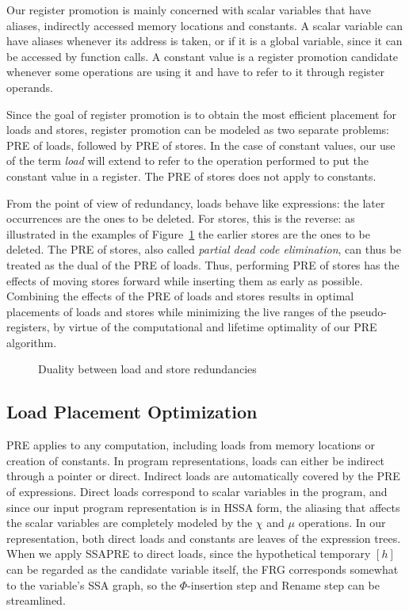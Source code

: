 Our register promotion is mainly concerned with scalar variables that have aliases, indirectly accessed memory locations and constants. 
A scalar variable can have aliases whenever its address is taken, or if it is a global variable, since it can be accessed by function calls. 
A constant value is a register promotion candidate whenever some operations are using it and have to refer to it through register operands. 

Since the goal of register promotion is to obtain the most efficient placement for loads and stores, register promotion can be modeled as two separate problems: 
PRE of loads, followed by PRE of stores. 
In the case of constant values, our use of the term \emph{load} will extend to refer to the operation performed to put the constant value in a register. 
The PRE of stores does not apply to constants.

From the point of view of redundancy, loads behave like expressions: 
the later occurrences are the ones to be deleted. 
For stores, this is the reverse: 
as illustrated in the examples of Figure~\ref{fig:load-store-dual} the earlier stores are the ones to be deleted. 
The PRE of stores, also called \emph{partial dead code elimination}, can thus be treated as the dual of the PRE of loads. 
Thus, performing PRE of stores has the effects of moving stores forward while inserting them as early as possible. 
Combining the effects of the PRE of loads and stores results in optimal placements of loads and stores while minimizing the live ranges of the pseudo-registers, by virtue of the computational and lifetime optimality of our PRE algorithm.

\begin{figure}
\centering
\caption{Duality between load and store redundancies}
\label{fig:load-store-dual}
\end{figure}

\subsection{Load Placement Optimization}
PRE applies to any computation, including loads from memory locations or creation of constants. 
In program representations, loads can either be indirect through a pointer or direct. 
Indirect loads are automatically covered by the PRE of expressions. 
Direct loads correspond to scalar variables in the program, and since our input program representation is in HSSA form, the aliasing that affects the scalar variables are completely modeled by the $\chi$ and $\mu$ operations. 
In our representation, both direct loads and constants are leaves of the expression trees. 
When we apply SSAPRE to direct loads, since the hypothetical temporary $[h]$ can be regarded as the candidate variable itself, the FRG corresponds somewhat to the variable's SSA graph, so the $\Phi$-insertion step and Rename step can be streamlined.


